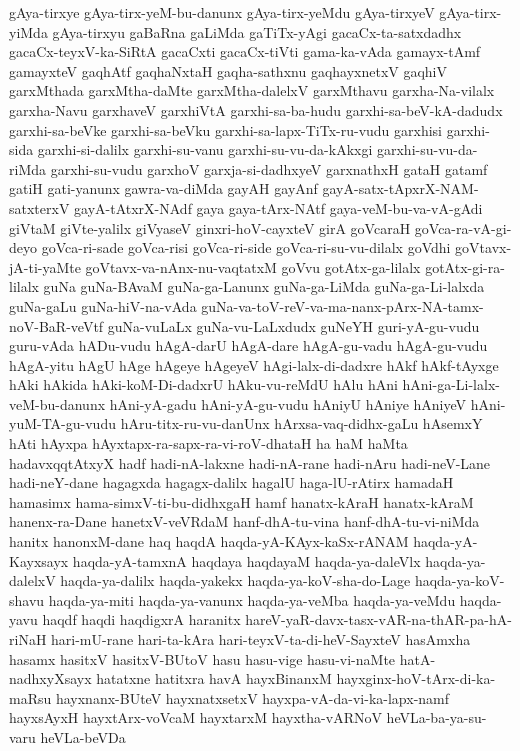 {gAya-tirxye
gAya-tirx-yeM-bu-danunx
gAya-tirx-yeMdu
gAya-tirxyeV
gAya-tirx-yiMda
gAya-tirxyu
gaBaRna
gaLiMda
gaTiTx-yAgi
gacaCx-ta-satxdadhx
gacaCx-teyxV-ka-SiRtA
gacaCxti
gacaCx-tiVti
gama-ka-vAda
gamayx-tAmf
gamayxteV
gaqhAtf
gaqhaNxtaH
gaqha-sathxnu
gaqhayxnetxV
gaqhiV
garxMthada
garxMtha-daMte
garxMtha-dalelxV
garxMthavu
garxha-Na-vilalx
garxha-Navu
garxhaveV
garxhiVtA
garxhi-sa-ba-hudu
garxhi-sa-beV-kA-dadudx
garxhi-sa-beVke
garxhi-sa-beVku
garxhi-sa-lapx-TiTx-ru-vudu
garxhisi
garxhi-sida
garxhi-si-dalilx
garxhi-su-vanu
garxhi-su-vu-da-kAkxgi
garxhi-su-vu-da-riMda
garxhi-su-vudu
garxhoV
garxja-si-dadhxyeV
garxnathxH
gataH
gatamf
gatiH
gati-yanunx
gawra-va-diMda
gayAH
gayAnf
gayA-satx-tApxrX-NAM-satxterxV
gayA-tAtxrX-NAdf
gaya
gaya-tArx-NAtf
gaya-veM-bu-va-vA-gAdi
giVtaM
giVte-yalilx
giVyaseV
ginxri-hoV-cayxteV
girA
goVcaraH
goVca-ra-vA-gi-deyo
goVca-ri-sade
goVca-risi
goVca-ri-side
goVca-ri-su-vu-dilalx
goVdhi
goVtavx-jA-ti-yaMte
goVtavx-va-nAnx-nu-vaqtatxM
goVvu
gotAtx-ga-lilalx
gotAtx-gi-ra-lilalx
guNa
guNa-BAvaM
guNa-ga-Lanunx
guNa-ga-LiMda
guNa-ga-Li-lalxda
guNa-gaLu
guNa-hiV-na-vAda
guNa-va-toV-reV-va-ma-nanx-pArx-NA-tamx-noV-BaR-veVtf
guNa-vuLaLx
guNa-vu-LaLxdudx
guNeYH
guri-yA-gu-vudu
guru-vAda
hADu-vudu
hAgA-darU
hAgA-dare
hAgA-gu-vadu
hAgA-gu-vudu
hAgA-yitu
hAgU
hAge
hAgeye
hAgeyeV
hAgi-lalx-di-dadxre
hAkf
hAkf-tAyxge
hAki
hAkida
hAki-koM-Di-dadxrU
hAku-vu-reMdU
hAlu
hAni
hAni-ga-Li-lalx-veM-bu-danunx
hAni-yA-gadu
hAni-yA-gu-vudu
hAniyU
hAniye
hAniyeV
hAni-yuM-TA-gu-vudu
hAru-titx-ru-vu-danUnx
hArxsa-vaq-didhx-gaLu
hAsemxY
hAti
hAyxpa
hAyxtapx-ra-sapx-ra-vi-roV-dhataH
ha
haM
haMta
hadavxqqtAtxyX
hadf
hadi-nA-lakxne
hadi-nA-rane
hadi-nAru
hadi-neV-Lane
hadi-neY-dane
hagagxda
hagagx-dalilx
hagalU
haga-lU-rAtirx
hamadaH
hamasimx
hama-simxV-ti-bu-didhxgaH
hamf
hanatx-kAraH
hanatx-kAraM
hanenx-ra-Dane
hanetxV-veVRdaM
hanf-dhA-tu-vina
hanf-dhA-tu-vi-niMda
hanitx
hanonxM-dane
haq
haqdA
haqda-yA-KAyx-kaSx-rANAM
haqda-yA-Kayxsayx
haqda-yA-tamxnA
haqdaya
haqdayaM
haqda-ya-daleVlx
haqda-ya-dalelxV
haqda-ya-dalilx
haqda-yakekx
haqda-ya-koV-sha-do-Lage
haqda-ya-koV-shavu
haqda-ya-miti
haqda-ya-vanunx
haqda-ya-veMba
haqda-ya-veMdu
haqda-yavu
haqdf
haqdi
haqdigxrA
haranitx
hareV-yaR-davx-tasx-vAR-na-thAR-pa-hA-riNaH
hari-mU-rane
hari-ta-kAra
hari-teyxV-ta-di-heV-SayxteV
hasAmxha
hasamx
hasitxV
hasitxV-BUtoV
hasu
hasu-vige
hasu-vi-naMte
hatA-nadhxyXsayx
hatatxne
hatitxra
havA
hayxBinanxM
hayxginx-hoV-tArx-di-ka-maRsu
hayxnanx-BUteV
hayxnatxsetxV
hayxpa-vA-da-vi-ka-lapx-namf
hayxsAyxH
hayxtArx-voVcaM
hayxtarxM
hayxtha-vARNoV
heVLa-ba-ya-su-varu
heVLa-beVDa
}
